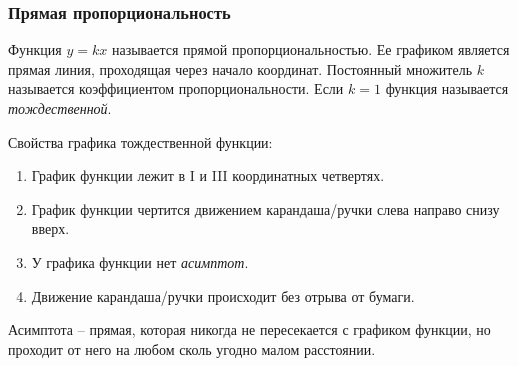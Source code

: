 \documentclass[algebra,twocolumn]{pum}
\date{19.03.20}
\begin{document}
\subsubsection*{Прямая пропорциональность}

  Функция $y=kx$ называется прямой пропорциональностью. Ее графиком является прямая линия, проходящая через начало координат. Постоянный множитель $k$ называется коэффициентом пропорциональности. Если $k=1$ функция называется \emph{тождественной}.

  \begin{center} 
  \end{center}

  Свойства графика тождественной функции:
  \begin{enumerate}[nosep]
    \item График функции лежит в I и III координатных четвертях.
    \item График функции чертится движением карандаша/ручки слева направо снизу вверх.
    \item У графика функции нет \emph{асимптот}.
    \item Движение карандаша/ручки происходит без отрыва от бумаги. 
  \end{enumerate}

  Асимптота -- прямая, которая никогда не пересекается с графиком функции, но проходит от него на любом сколь угодно малом расстоянии.
\end{document}
